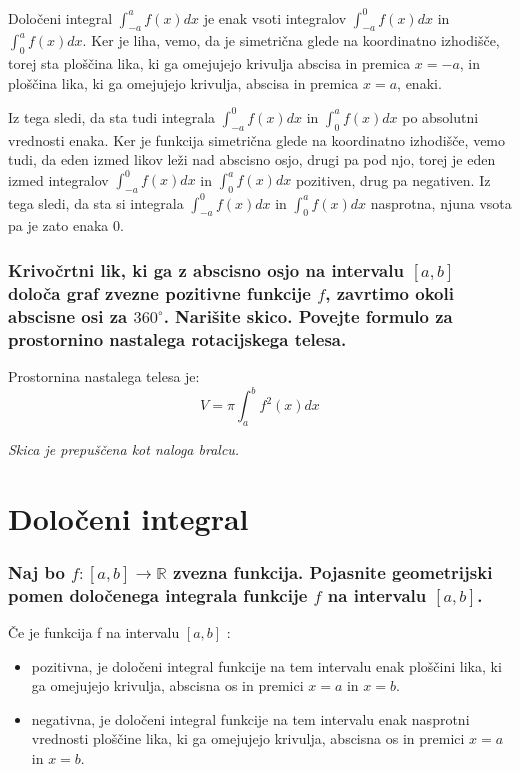 \documentclass{article}
\begin{document}
Določeni integral $\int_{-a}^{a} f(x) d x$ je enak vsoti integralov $\int_{-a}^{0} f(x) d x$ in $\int_{0}^{a} f(x) d x$. Ker je liha, vemo, da je simetrična glede na koordinatno izhodišče, torej sta ploščina lika, ki ga omejujejo krivulja abscisa in premica $x=-a$, in ploščina lika, ki ga omejujejo krivulja, abscisa in premica $x=a$, enaki.

Iz tega sledi, da sta tudi integrala $\int_{-a}^{0} f(x) d x$ in $\int_{0}^{a} f(x) d x$ po absolutni vrednosti enaka. Ker je funkcija simetrična glede na koordinatno izhodišče, vemo tudi, da eden izmed likov leži nad abscisno osjo, drugi pa pod njo, torej je eden izmed integralov $\int_{-a}^{0} f(x) d x$ in $\int_{0}^{a} f(x) d x$ pozitiven, drug pa negativen. Iz tega sledi, da sta si integrala $\int_{-a}^{0} f(x) d x$ in $\int_{0}^{a} f(x) d x$ nasprotna, njuna vsota pa je zato enaka 0.

\subsubsection*{Krivočrtni lik, ki ga z abscisno osjo na intervalu $[a, b]$ določa graf zvezne pozitivne funkcije $f$, zavrtimo okoli abscisne osi za $360^{\circ}$. Narišite skico. Povejte formulo za prostornino nastalega rotacijskega telesa.}
Prostornina nastalega telesa je:
$$
V = \pi \int_{a}^{b}{f^2(x) dx}
$$

\textit{Skica je prepuščena kot naloga bralcu.}
\section{Določeni integral}
\subsubsection*{Naj bo $f:[a, b] \rightarrow \mathbb{R}$ zvezna funkcija. Pojasnite geometrijski pomen določenega integrala funkcije $f$ na intervalu $[a, b]$.}

Če je funkcija f na intervalu $[a, b]$ :

\begin{itemize}
  \item pozitivna, je določeni integral funkcije na tem intervalu enak ploščini lika, ki ga omejujejo krivulja, abscisna os in premici $x=a$ in $x=b$.

  \item negativna, je določeni integral funkcije na tem intervalu enak nasprotni vrednosti ploščine lika, ki ga omejujejo krivulja, abscisna os in premici $x=a$ in $x=b$.

\end{itemize}
\end{document}
